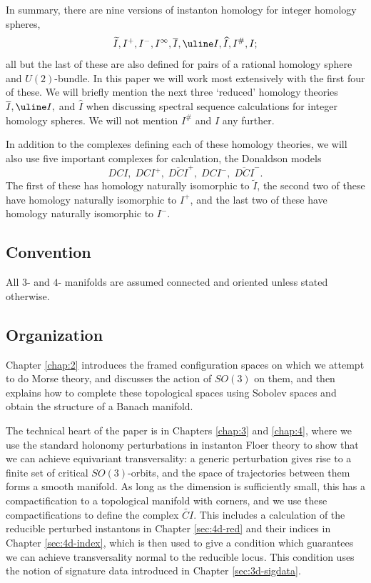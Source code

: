 \documentclass{memo-l}
\theoremstyle{definition}
\theoremstyle{remark}
\numberwithin{section}{chapter}
\numberwithin{equation}{chapter}
\begin{document}
In summary, there are nine versions of instanton homology for integer homology spheres, $$\widetilde{I}, I^+, I^-, I^{\infty}, \overline I, \uline I, \widehat I, I^{\#}, I;$$ all but the last of these are also defined for pairs of a rational homology sphere and $U(2)$-bundle. In this paper we will work most extensively with the first four of these. We will briefly mention the next three `reduced’ homology theories $\overline I, \uline I,$ and $\hat I$ when discussing spectral sequence calculations for integer homology spheres. We will not mention $I^{\#}$ and $I$ any further.

In addition to the complexes defining each of these homology theories, we will also use five important complexes for calculation, the Donaldson models $$DCI, \; DCI^+, \; \overline{DCI}^+, \; DCI^-, \; \overline{DCI}^-.$$ The first of these has homology naturally isomorphic to $\widetilde I$, the second two of these have homology naturally isomorphic to $I^+$, and the last two of these have homology naturally isomorphic to $I^-$.  
%
%
%
\subsection*{Convention} 
All $3$- and $4$- manifolds are assumed connected and oriented unless stated otherwise. 

\subsection*{Organization}
Chapter \ref{chap:2} introduces the framed configuration spaces on which we attempt to do Morse theory, and discusses the action of $SO(3)$ on them, and then explains how to complete these topological spaces using Sobolev spaces and obtain the structure of a Banach manifold.

The technical heart of the paper is in Chapters \ref{chap:3} and \ref{chap:4}, where we use the standard holonomy perturbations in instanton Floer theory to show that we can achieve equivariant transversality: a generic perturbation gives rise to a finite set of critical $SO(3)$-orbits, and the space of trajectories between them forms a smooth manifold. As long as the dimension is sufficiently small, this has a compactification to a topological manifold with corners, and we use these compactifications to define the complex $\widetilde{CI}$. This includes a calculation of the reducible perturbed instantons in Chapter \ref{sec:4d-red} and their indices in Chapter \ref{sec:4d-index}, which is then used to give a condition which guarantees we can achieve transversality normal to the reducible locus. This condition uses the notion of signature data introduced in Chapter \ref{sec:3d-sigdata}.
\end{document}

